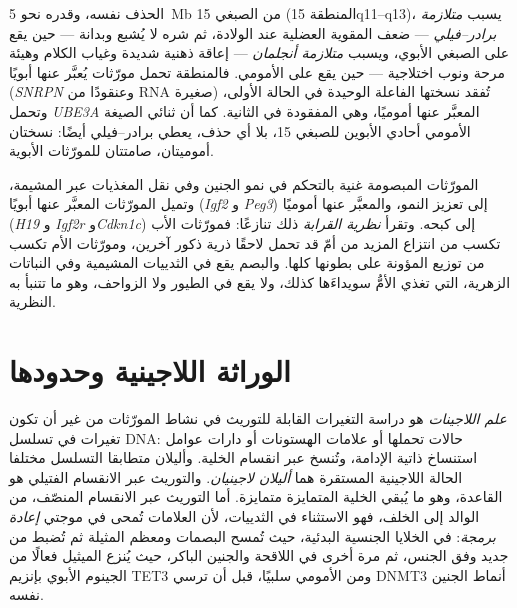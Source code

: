 \begin{example}\label{ex:b3:chromatin-epigenetics:pws}
الحذف نفسه، وقدره نحو \qty{5}{Mb} من الصبغي 15 (المنطقة
15q11--q13)، يسبب \emph{متلازمة برادر--فيلي} --- ضعف المقوية العضلية
عند الولادة، ثم شره لا يُشبع وبدانة --- حين يقع على الصبغي الأبوي،
ويسبب \emph{متلازمة أنجلمان} --- إعاقة ذهنية شديدة وغياب الكلام
وهيئة مرحة ونوب اختلاجية --- حين يقع على الأمومي. فالمنطقة تحمل
مورّثات يُعبَّر عنها أبويًا (\emph{SNRPN} وعنقودًا من RNA صغيرة)
تُفقد نسختها الفاعلة الوحيدة في الحالة الأولى، وتحمل \emph{UBE3A}
المعبَّر عنها أموميًا، وهي المفقودة في الثانية. كما أن ثنائي الصيغة
الأمومي أحادي الأبوين للصبغي 15، بلا أي حذف، يعطي برادر--فيلي أيضًا:
نسختان أموميتان، صامتتان للمورّثات الأبوية.
\end{example}

\begin{remark}\label{rem:b3:chromatin-epigenetics:kinship}
المورّثات المبصومة غنية بالتحكم في نمو الجنين وفي نقل المغذيات عبر
المشيمة، وتميل المورّثات المعبَّر عنها أبويًا (\emph{Igf2} و
\emph{Peg3}) إلى تعزيز النمو، والمعبَّر عنها أموميًا (\emph{H19} و
\emph{Igf2r} و\emph{Cdkn1c}) إلى كبحه. وتقرأ \emph{نظرية القرابة}
ذلك تنازعًا: فمورّثات الأب تكسب من انتزاع المزيد من أمّ قد تحمل
لاحقًا ذرية ذكور آخرين، ومورّثات الأم تكسب من توزيع المؤونة على
بطونها كلها. والبصم يقع في الثدييات المشيمية وفي النباتات الزهرية،
التي تغذي الأمُّ سويداءَها كذلك، ولا يقع في الطيور ولا الزواحف، وهو
ما تتنبأ به النظرية.
\end{remark}

\section{الوراثة اللاجينية وحدودها}

\begin{definition}\label{def:b3:chromatin-epigenetics:epigenetics}
\emph{علم اللاجينات} هو دراسة التغيرات القابلة للتوريث في نشاط
المورّثات من غير أن تكون تغيرات في تسلسل DNA: حالات تحملها 
أو علامات الهستونات أو دارات عوامل استنساخ ذاتية الإدامة، وتُنسخ عبر
انقسام الخلية. وأليلان متطابقا التسلسل مختلفا الحالة اللاجينية
المستقرة هما \emph{أليلان لاجينيان}. والتوريث عبر الانقسام الفتيلي هو
القاعدة، وهو ما يُبقي الخلية المتمايزة متمايزة. أما التوريث عبر
الانقسام المنصّف، من الوالد إلى الخلف، فهو الاستثناء في الثدييات، لأن
العلامات تُمحى في موجتي \emph{إعادة برمجة}: في الخلايا الجنسية
البدئية، حيث تُمسح البصمات ومعظم المثيلة ثم تُضبط من جديد وفق الجنس،
ثم مرة أخرى في اللاقحة والجنين الباكر، حيث يُنزع الميثيل فعالًا من
الجينوم الأبوي بإنزيم TET3 ومن الأمومي سلبيًا، قبل أن ترسي DNMT3 أنماط
الجنين نفسه.
\end{definition}

